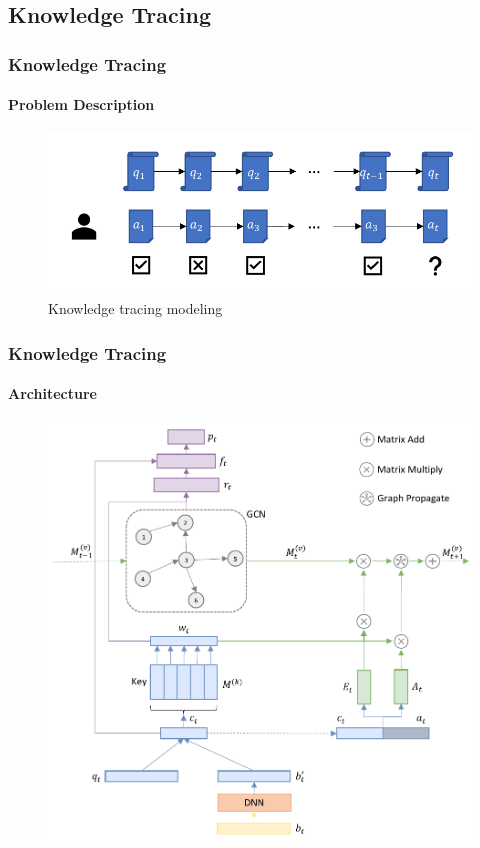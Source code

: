 \documentclass[10pt,aspectratio=43,mathserif]{beamer}
\begin{document}
\subsection{Knowledge Tracing}

\begin{frame}
	\frametitle{Knowledge Tracing}
	\framesubtitle{Problem Description}
	\begin{figure}
		\centering
		\includegraphics[width=1.0\textwidth]{figures/ch3-model-ktdes.pdf}
		\caption{Knowledge tracing modeling}
	\end{figure}
\end{frame}


\begin{frame}
	\frametitle{Knowledge Tracing}
	\framesubtitle{Architecture}
	\begin{figure}
		\centering
		\includegraphics[height=0.80\textheight]{figures/ch3-ov.pdf}
	\end{figure}
\end{frame}
\end{document}
